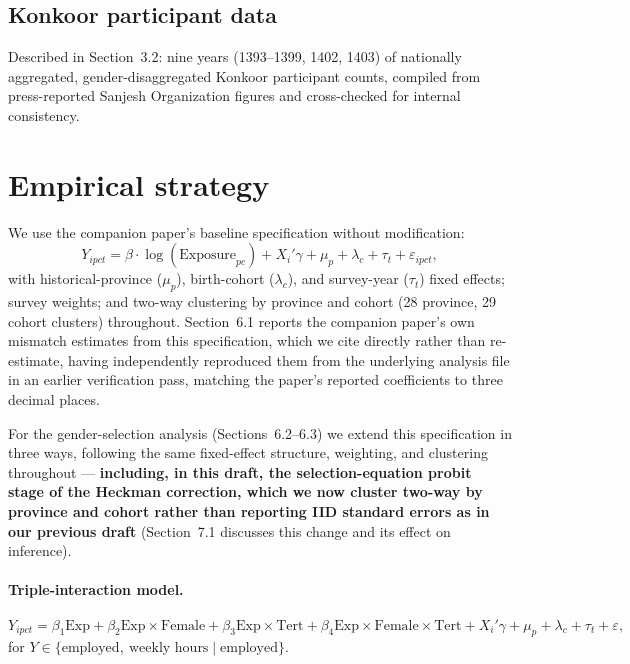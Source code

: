 \documentclass[11pt]{article}
\begin{document}
\subsection{Konkoor participant data}

Described in Section~3.2: nine years (1393--1399, 1402, 1403) of nationally aggregated, gender-disaggregated Konkoor participant counts, compiled from press-reported Sanjesh Organization figures and cross-checked for internal consistency.

\section{Empirical strategy}

We use the companion paper's baseline specification without modification:
\begin{equation}
Y_{ipct} = \beta \cdot \log(\text{Exposure}_{pc}) + X_i'\gamma + \mu_p + \lambda_c + \tau_t + \varepsilon_{ipct},
\end{equation}
with historical-province ($\mu_p$), birth-cohort ($\lambda_c$), and survey-year ($\tau_t$) fixed effects; survey weights; and two-way clustering by province and cohort (28 province, 29 cohort clusters) throughout. Section~6.1 reports the companion paper's own mismatch estimates from this specification, which we cite directly rather than re-estimate, having independently reproduced them from the underlying analysis file in an earlier verification pass, matching the paper's reported coefficients to three decimal places.

For the gender-selection analysis (Sections~6.2--6.3) we extend this specification in three ways, following the same fixed-effect structure, weighting, and clustering throughout --- \textbf{including, in this draft, the selection-equation probit stage of the Heckman correction, which we now cluster two-way by province and cohort rather than reporting IID standard errors as in our previous draft} (Section~7.1 discusses this change and its effect on inference).

\paragraph{Triple-interaction model.}
\begin{equation}
Y_{ipct} = \beta_1 \text{Exp} + \beta_2 \text{Exp}\times\text{Female} + \beta_3 \text{Exp}\times\text{Tert} + \beta_4 \text{Exp}\times\text{Female}\times\text{Tert} + X_i'\gamma + \mu_p + \lambda_c + \tau_t + \varepsilon,
\end{equation}
for $Y \in \{\text{employed},\ \text{weekly hours} \mid \text{employed}\}$.
\end{document}
